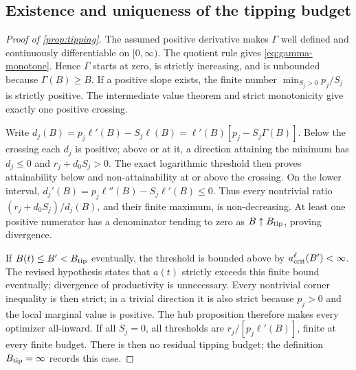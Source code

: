 \subsection{Existence and uniqueness of the tipping budget}
\label{app:tipping-proof}
\begin{proof}[Proof of \cref{prop:tipping}]
The assumed positive derivative makes $\Gamma$ well defined and
continuously differentiable on $[0,\infty)$. The quotient rule gives
\cref{eq:gamma-monotone}. Hence $\Gamma$ starts at zero, is strictly
increasing, and is unbounded because $\Gamma(B)\geq B$.
If a positive slope exists, the finite number
$\min_{S_j>0}p_j/S_j$ is strictly positive. The intermediate value
theorem and strict monotonicity give exactly one positive crossing.

Write $d_j(B)=p_j\ell'(B)-S_j\ell(B)
=\ell'(B)[p_j-S_j\Gamma(B)]$.
Below the crossing each $d_j$ is positive; above or at it, a direction
attaining the minimum has $d_j\leq0$ and $r_j+d_0S_j>0$.
The exact logarithmic threshold then proves attainability below and
non-attainability at or above the crossing. On the lower interval,
$d_j'(B)=p_j\ell''(B)-S_j\ell'(B)\leq0$. Thus every nontrivial
ratio $(r_j+d_0S_j)/d_j(B)$, and their finite maximum, is
non-decreasing. At least one positive numerator has a denominator
tending to zero as $B\uparrow B_{\rm tip}$, proving divergence.

If $B(t)\leq B'<B_{\rm tip}$ eventually, the threshold is bounded
above by $a_{\rm crit}^{\ell}(B')<\infty$. The revised hypothesis
states that $a(t)$ strictly exceeds this finite bound eventually;
divergence of productivity is unnecessary. Every nontrivial corner inequality
is then strict; in a trivial direction it is also strict because
$p_j>0$ and the local marginal value is positive. The hub proposition
therefore makes every optimizer all-inward. If all $S_j=0$, all
thresholds are $r_j/[p_j\ell'(B)]$, finite at every finite budget.
There is then no residual tipping budget; the definition
$B_{\rm tip}=\infty$ records this case.
\end{proof}

